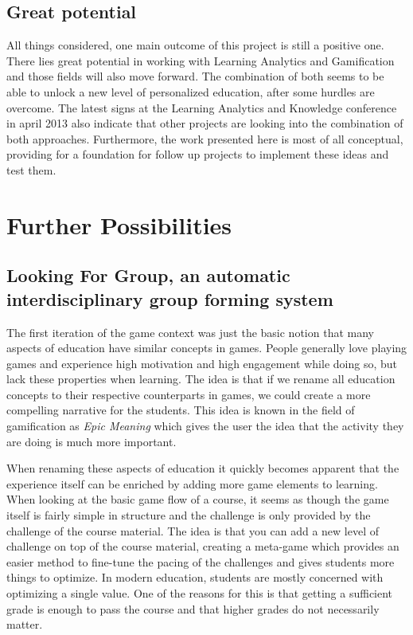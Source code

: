 \documentclass[11pt]{article}
\begin{document}
\subsection{Great potential}
All things considered, one main outcome of this project is still a positive one. There lies great potential in working with Learning Analytics and Gamification and those fields will also move forward. The combination of both seems to be able to unlock a new level of personalized education, after some hurdles are overcome. The latest signs at the Learning Analytics and Knowledge conference in april 2013 also indicate that other projects are looking into the combination of both approaches. Furthermore, the work presented here is most of all conceptual, providing for a foundation for follow up projects to implement these ideas and test them. 

\pagebreak
\small{


}

\pagebreak
\appendix
\section{Further Possibilities}
\subsection{Looking For Group, an automatic interdisciplinary group forming system}
The first iteration of the game context was just the basic notion that many aspects of education have similar concepts in games. People generally love playing games and experience high motivation and high engagement while doing so, but lack these properties when learning. The idea is that if we rename all education concepts to their respective counterparts in games, we could create a more compelling narrative for the students. This idea is known in the field of gamification as \emph{Epic Meaning} which gives the user the idea that the activity they are doing is much more important. 

When renaming these aspects of education it quickly becomes apparent that the experience itself can be enriched by adding more game elements to learning. When looking at the basic game flow of a course, it seems as though the game itself is fairly simple in structure and the challenge is only provided by the challenge of the course material. The idea is that you can add a new level of challenge on top of the course material, creating a meta-game which provides an easier method to fine-tune the pacing of the challenges and gives students more things to optimize. In modern education, students are mostly concerned with optimizing a single value. One of the reasons for this is that getting a sufficient grade is enough to pass the course and that higher grades do not necessarily matter. 
\end{document}
